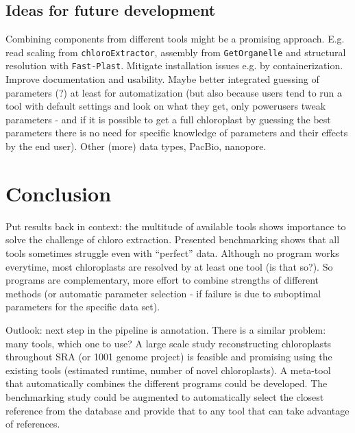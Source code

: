 \documentclass{bmcart}
\newcommand{\formatprogramnames}[1]{\texttt{#1}}
\newcommand{\ce}{\formatprogramnames{chloroExtractor}}
\newcommand{\fp}{\formatprogramnames{Fast-Plast}}
\newcommand{\go}{\formatprogramnames{GetOrganelle}}
\begin{document}

\subsection*{Ideas for future development}
Combining components from different tools might be a promising approach. E.g. read scaling from \ce{}, assembly from \go{} and structural resolution with \fp{}.
Mitigate installation issues e.g. by containerization.
Improve documentation and usability.
Maybe better integrated guessing of parameters (?) at least for automatization (but also because users tend to run a tool with default settings and look on what they get, only powerusers tweak parameters - and if it is possible to get a full chloroplast by guessing the best parameters there is no need for specific knowledge of parameters and their effects by the end user).
Other (more) data types, PacBio, nanopore.

\section*{Conclusion}

Put results back in context: the multitude of available tools shows importance to solve the challenge of chloro extraction. Presented benchmarking shows that all tools sometimes struggle even with ``perfect'' data. Although no program works everytime, most chloroplasts are resolved by at least one tool (is that so?). So programs are complementary, more effort to combine strengths of different methods (or automatic parameter selection - if failure is due to suboptimal parameters for the specific data set).

Outlook: next step in the pipeline is annotation. There is a similar problem: many tools, which one to use? 
A large scale study reconstructing chloroplasts throughout SRA (or \num{1001} genome project) is feasible and promising using the existing tools (estimated runtime, number of novel chloroplasts).
A meta-tool that automatically combines the different programs could be developed.
The benchmarking study could be augmented to automatically select the closest reference from the database and provide that to any tool that can take advantage of references.
\end{document}
